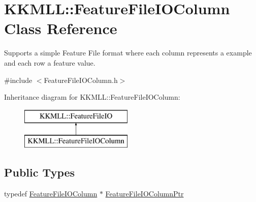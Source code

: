 \hypertarget{class_k_k_m_l_l_1_1_feature_file_i_o_column}{}\section{K\+K\+M\+LL\+:\+:Feature\+File\+I\+O\+Column Class Reference}
\label{class_k_k_m_l_l_1_1_feature_file_i_o_column}


Supports a simple Feature File format where each column represents a example and each row a feature value.  




{\ttfamily \#include $<$Feature\+File\+I\+O\+Column.\+h$>$}

Inheritance diagram for K\+K\+M\+LL\+:\+:Feature\+File\+I\+O\+Column\+:\begin{figure}[H]
\begin{center}
\leavevmode
\includegraphics[height=2.000000cm]{class_k_k_m_l_l_1_1_feature_file_i_o_column}
\end{center}
\end{figure}
\subsection*{Public Types}
\begin{DoxyCompactItemize}
\item 
typedef \hyperlink{class_k_k_m_l_l_1_1_feature_file_i_o_column}{Feature\+File\+I\+O\+Column} $\ast$ \hyperlink{class_k_k_m_l_l_1_1_feature_file_i_o_column_aa10d6d26b30e5280faf79e11863b49bc}{Feature\+File\+I\+O\+Column\+Ptr}
\end{DoxyCompactItemize}
